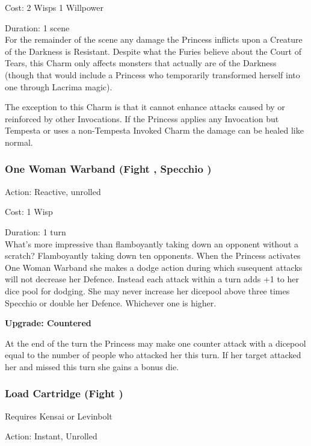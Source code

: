 \noindent Cost: 2 Wisps 1 Willpower

\noindent Duration: 1 scene\\

For the remainder of the scene any damage the Princess inflicts upon a Creature of the Darkness is Resistant. Despite what the Furies believe about the Court of Tears, this Charm only affects monsters that actually are of the Darkness (though that would include a Princess who temporarily transformed herself into one through Lacrima magic). 

The exception to this Charm is that it cannot enhance attacks caused by or reinforced by other Invocations. If the Princess applies any Invocation but Tempesta or uses a non-Tempesta Invoked Charm the damage can be healed like normal. 

\subsubsection*{One Woman Warband (Fight \textbullet\textbullet, Specchio \textbullet\textbullet\textbullet)}

\noindent Action: Reactive, unrolled

\noindent Cost: 1 Wisp

\noindent Duration: 1 turn\\

\noindent What's more impressive than flamboyantly taking down an opponent without a scratch? Flamboyantly taking down ten opponents. When the Princess activates One Woman Warband she makes a dodge action during which susequent attacks will not decrease her Defence. Instead each attack within a turn adds +1 to her dice pool for dodging. She may never increase her dicepool above three times Specchio or double her Defence. Whichever one is higher. 

\textbf{Upgrade: Countered}

At the end of the turn the Princess may make one counter attack with a dicepool equal to the number of people who attacked her this turn. If her target attacked her and missed this turn she gains a bonus die.


\subsubsection*{Load Cartridge (Fight \textbullet\textbullet\textbullet)}
\noindent Requires Kensai or Levinbolt

\noindent Action: Instant, Unrolled


